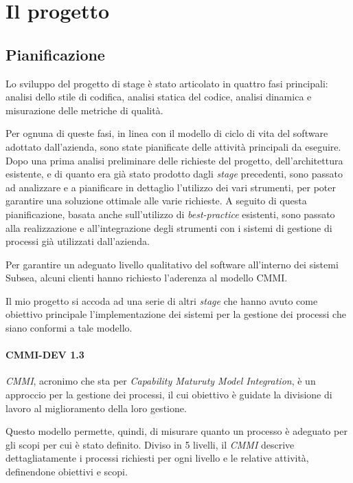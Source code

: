 \newcommand{\code}[1]{\texttt{#1}}
\chapter{Il progetto}

\section{Pianificazione}

Lo sviluppo del progetto di stage è stato articolato in quattro fasi principali: analisi dello stile di codifica, analisi statica del codice, analisi dinamica e misurazione delle metriche di qualità. 

Per ognuna di queste fasi, in linea con il modello di ciclo di vita del software adottato dall'azienda, sono state pianificate delle attività principali da eseguire. Dopo una prima analisi preliminare delle richieste del progetto, dell'architettura esistente, e di quanto era già stato prodotto dagli \textit{stage} precedenti, sono passato ad analizzare e a pianificare in dettaglio l'utilizzo dei vari strumenti, per poter garantire una soluzione ottimale alle varie richieste. A seguito di questa pianificazione, basata anche sull'utilizzo di \textit{best-practice} esistenti, sono passato alla realizzazione e all'integrazione degli strumenti con i sistemi di gestione di processi già utilizzati dall'azienda.

Per garantire un adeguato livello qualitativo del software all'interno dei sistemi Subsea, alcuni clienti hanno richiesto l'aderenza al modello CMMI. 

Il mio progetto si accoda ad una serie di altri \textit{stage} che hanno avuto come obiettivo principale l'implementazione dei sistemi per la gestione dei processi che siano conformi a tale modello.


\subsubsection*{CMMI-DEV 1.3}
\textit{CMMI}, acronimo che sta per \textit{Capability Maturuty Model Integration}, è un approccio per la gestione dei processi, il cui obiettivo è guidate la divisione di lavoro al miglioramento della loro gestione. 

Questo modello permette, quindi, di misurare quanto un processo è adeguato per gli scopi per cui è stato definito. Diviso in 5 livelli, il \textit{CMMI} descrive dettagliatamente i processi richiesti per ogni livello e le relative attività, definendone obiettivi e scopi.

